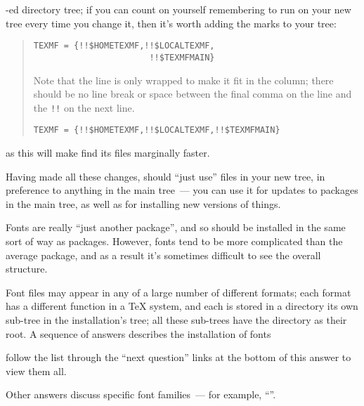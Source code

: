 -ed directory tree; if you can count on yourself
remembering to run  on your new tree every time you
change it, then it's worth adding the marks to your tree:
\begin{quote}
\begin{narrowversion}
\begin{verbatim}
TEXMF = {!!$HOMETEXMF,!!$LOCALTEXMF,
                       !!$TEXMFMAIN}
\end{verbatim}
{\small Note that the line is only wrapped to make it
  fit in the column; there should be no line break or space between
  the final comma on the line and the \texttt{!!} on the next line.\par
}%
\end{narrowversion}
\begin{wideversion}
\begin{verbatim}
TEXMF = {!!$HOMETEXMF,!!$LOCALTEXMF,!!$TEXMFMAIN}
\end{verbatim}
\end{wideversion}
\end{quote}
as this will make \AllTeX{} find its files marginally faster.

Having made all these changes, \AllTeX{} should ``just use'' files in
your new tree, in preference to anything in the main tree~--- you can
use it for updates to packages in the main tree, as well as for
installing new versions of things.


Fonts are really ``just another package'', and so should be installed
in the same sort of way as packages.  However, fonts tend to be more
complicated than the average package, and as a result it's sometimes
difficult to see the overall structure.

Font files may appear in any of a large number of different formats;
each format has a different function in a \TeX{} system, and each is
stored in a directory its own sub-tree in the installation's
 tree; all these sub-trees have the directory
as their root.  A sequence of answers describes the
installation of fonts
\begin{htmlversion}
follow the list through the ``next question'' links at the bottom of
this answer to view them all.
\end{htmlversion}
Other answers discuss specific font families~--- for example,
``''.


